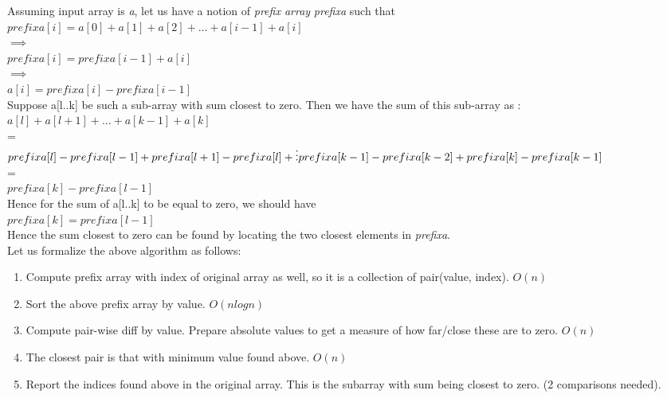 Assuming input array is \emph{a}, let us have a notion of \emph{prefix array} \textit{prefixa} such that \\
$prefixa[i] = a[0] + a[1] + a[2] + \ldots + a[i - 1] + a[i]$\\
$\implies$\\
$prefixa[i] = prefixa[i - 1] + a[i]$\\
$\implies$\\
$a[i] = prefixa[i] - prefixa[i - 1]$
\vspace{1mm}\\
Suppose a[l..k] be such a sub-array with sum closest to zero. Then we have the sum of this sub-array as :\\
$a[l] + a[l + 1] + \ldots + a[k - 1] + a[k]$ \\
=\\
$prefixa[l] - prefixa[l - 1] + \\
prefixa[l + 1] - prefixa[l] + \\
\vdots\\
prefixa[k - 1] - prefixa[k - 2] +  \\
prefixa[k] - prefixa[k - 1]$
\vspace{1mm}\\
=\\
$prefixa[k] - prefixa[l - 1]$
\vspace{1mm}\\
Hence for the sum of a[l..k] to be equal to zero, we should have \\$prefixa[k] = prefixa[l - 1]$
\vspace{1mm}\\
Hence the sum closest to zero can be found by locating the two closest elements in \emph{prefixa}.
\vspace{2mm}\\
Let us formalize the above algorithm as follows:
\begin{enumerate}
    \item Compute prefix array with index of original array as well, so it is a collection of pair(value, index). $O(n)$
    \item Sort the above prefix array by value. $O(nlogn)$
    \item Compute pair-wise diff by value. Prepare absolute values to get a measure of how far/close these are to zero. $O(n)$
    \item The closest pair is that with minimum value found above.  $O(n)$
    \item Report the indices found above in the original array. This is the subarray with sum being closest to zero.  (2 comparisons needed).
\end{enumerate}

